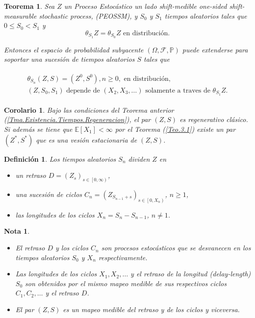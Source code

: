 \documentclass{article}
\newtheorem{Def}{Definición}[section]
\newtheorem{Teo}{Teorema}[section]
\newtheorem{Note}{Nota}[section]
\newtheorem{Cor}{Corolario}[section]
\newcommand{\esp}{\mathbb{E}}
\newcommand{\prob}{\mathbb{P}}
\numberwithin{equation}{section}
\begin{document}
\begin{Teo}
Sea $Z$ un Proceso Estoc\'astico un lado shift-medible \textit{one-sided shift-measurable stochastic process}, (PEOSSM), y $S_{0}$ y $S_{1}$ tiempos aleatorios tales que $0\leq S_{0}<S_{1}$ y
\begin{equation}
\theta_{S_{1}}Z=\theta_{S_{0}}Z\textrm{ en distribuci\'on}.
\end{equation}

Entonces el espacio de probabilidad subyacente $\left(\Omega,\mathcal{F},\prob\right)$ puede extenderse para soportar una sucesi\'on de tiempos aleatorios $S$ tales que

\begin{eqnarray}
\begin{array}{l}
\theta_{S_{n}}\left(Z,S\right)=\left(Z^{0},S^{0}\right),n\geq0,\textrm{ en distribuci\'on},\\
\left(Z,S_{0},S_{1}\right)\textrm{ depende de }\left(X_{2},X_{3},\ldots\right)\textrm{ solamente a traves de }\theta_{S_{1}}Z.
\end{array}
\end{eqnarray}
\end{Teo}


\begin{Cor}\label{Tma.Estacionariedad}
Bajo las condiciones del Teorema anterior (\ref{Tma.Existencia.Tiempos.Regeneracion}), el par $\left(Z,S\right)$ es regenerativo cl\'asico. Si adem\'as se tiene que $\esp\left[X_{1}\right]<\infty$ por el Teorema (\ref{Teo.3.1}) existe un par $\left(Z^{*},S^{*}\right)$ que es una vesi\'on estacionaria de $\left(Z,S\right)$.
\end{Cor}

\begin{Def}
Los tiempos aleatorios $S_{n}$ dividen $Z$ en 
\begin{itemize}
\item[a)] un retraso $D=\left(Z_{s}\right)_{s\in\left[0,\infty\right)}$,
\item[b)] una sucesi\'on de ciclos $C_{n}=\left(Z_{S_{n-1}+s}\right)_{ s\in\left[0,X_{n}\right)}$, $n\geq1$,
\item[c)] las longitudes de los ciclos $X_{n}=S_{n}-S_{n-1}$, $n\neq1$.
\end{itemize}
\end{Def}

\begin{Note}
\begin{itemize}
\item[a)] El retraso $D$ y los ciclos $C_{n}$ son procesos estoc\'asticos que se desvanecen en los tiempos aleatorios $S_{0}$ y $X_{n}$ respectivamente.
\item[b)] Las longitudes de los ciclos $X_{1},X_{2},\ldots$ y el retraso de la longitud (\textit{delay-length}) $S_{0}$ son obtenidos por el mismo mapeo medible de sus respectivos ciclos $C_{1},C_{2},\ldots$ y el retraso $D$. 
\item[c)] El par $\left(Z,S\right)$ es un mapeo medible del retraso y de los ciclos y viceversa.
\end{itemize}
\end{Note}
\end{document}
